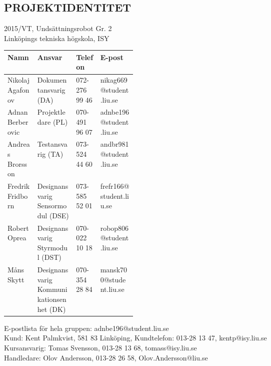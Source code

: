 \documentclass[11pt]{article}
\begin{document}
\pagebreak
\begin{center}

\section*{PROJEKTIDENTITET}
2015/VT, Undsättningsrobot Gr. 2
\\
Linköpings tekniska högskola, ISY
\\[0.5in]
\begin{table}[h]
\begin{tabular}{|l|p{0.3\linewidth}|l|l|} \hline
Namn & Ansvar & Telefon & E-post \\[0.1in] \hline
Nikolaj Agafonov & Dokumentansvarig (DA) & 072-276 99 46 & nikag669@student.liu.se \\ \hline
Adnan Berberovic & Projektledare (PL) & 070-491 96 07 & adnbe196@student.liu.se \\ \hline
Andreas Brorsson & Testansvarig (TA) & 073-524 44 60 & andbr981@student.liu.se \\ \hline
Fredrik Fridborn & Designansvarig Sensormodul (DSE) & 073-585 52 01 & frefr166@student.liu.se \\ \hline
Robert Oprea & Designansvarig Styrmodul (DST) & 070-022 10 18 & robop806@student.liu.se \\ \hline
Måns Skytt & Designansvarig Kommunikationsenhet (DK) & 070-354 28 84 & mansk700@student.liu.se \\ \hline
\end{tabular}
\end{table}

E-postlista för hela gruppen: adnbe196@student.liu.se
\\[1in]
Kund: Kent Palmkvist, 581 83 Linköping,
Kundtelefon: 013-28 13 47, kentp@isy.liu.se
\\[1in]
Kursansvarig: Tomas Svensson, 013-28 13 68, tomass@isy.liu.se
\\
Handledare: Olov Andersson, 013-28 26 58, Olov.Andersson@liu.se
\end{center}
\pagebreak

\tableofcontents

\pagebreak
\end{document}
